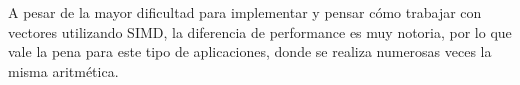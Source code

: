 \documentclass[10pt,a4paper,spanish]{article}
\begin{document}
A pesar de la mayor dificultad para implementar y pensar cómo trabajar con vectores utilizando SIMD, la diferencia de performance es muy notoria, por lo que vale la pena para este tipo de aplicaciones, donde se realiza numerosas veces la misma aritmética.





\end{document}
